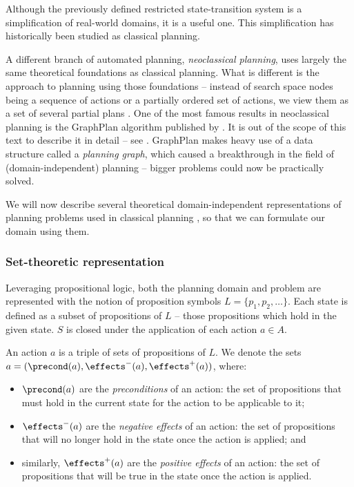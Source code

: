 Although the previously defined restricted state-transition system is a simplification of real-world
domains, it is a useful one. 
This simplification has historically been studied as classical planning.

A different branch of automated planning, \textit{neoclassical planning},
uses largely the same theoretical foundations as classical 
planning. What is different is the approach to planning using those foundations
-- instead of search space nodes being a sequence of actions or a partially ordered
set of actions, we view them as a set of several partial plans
\citep[Part~II]{Ghallab2004}.
One of the most famous results in neoclassical planning is the GraphPlan algorithm
published by \citet{Blum1997}. It is out of the scope of this text to describe it in detail
-- see \citet[Section~6.3]{Ghallab2004}.
GraphPlan makes heavy use of a data structure called a \textit{planning graph},
which caused a breakthrough in the field of (domain-independent) planning
-- bigger problems could now be practically solved.

We will now describe several theoretical domain-independent representations
of planning problems used in classical planning \citep[Chapter~2]{Ghallab2004},
so that we can formulate our domain using them.

\subsubsection{Set-theoretic representation}

Leveraging propositional logic, both the planning domain and problem
are represented with the notion
of proposition symbols $L = \{p_1, p_2, \ldots\}$.
Each state is defined as a subset of propositions of $L$ -- those propositions
which hold in the given state. $S$ is closed under the application of each
action $a \in A$.

An action $a$
is a triple of sets of propositions of $L$.
We denote the sets $a = (\precond(a), \effects^-(a), \effects^+(a))$, where:
\begin{itemize}
\item $\precond(a)$ are the \textit{preconditions} of an action: the set of
propositions that must hold in the current state for the action to be applicable to it;
\item $\effects^-(a)$ are the \textit{negative effects} of an action:
the set of propositions
that will no longer hold in the state once the action is applied; and
\item similarly, $\effects^+(a)$ are the \textit{positive effects} of an action:
the set of propositions that will be true in the state once the action is applied.
\end{itemize}

